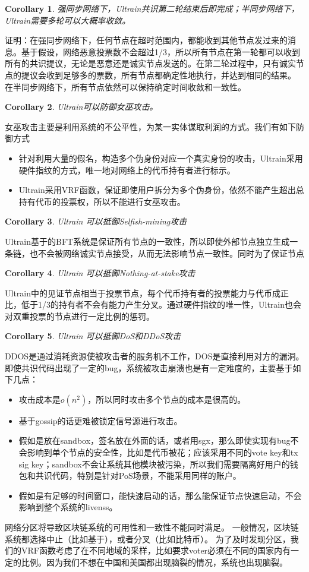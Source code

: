 \documentclass[12pt, UTF8]{article}
\newtheorem{corollary}{Corollary}[theorem]
\begin{document}
\begin{corollary}
强同步网络下，Ultrain共识第二轮结束后即完成；半同步网络下，Ultrain需要多轮可以大概率收敛。
\end{corollary}
证明：在强同步网络下，任何节点在超时范围内，都能收到其他节点发过来的消息。基于假设，网络恶意投票数不会超过1/3，所以所有节点在第一轮都可以收到所有的共识提议，无论是恶意还是诚实节点发送的。在第二轮过程中，只有诚实节点的提议会收到足够多的票数，所有节点都确定性地执行，并达到相同的结果。
在半同步网络下，所有节点依然可以保持确定时间收敛和一致性。

\begin{corollary}
Ultrain可以防御女巫攻击。
\end{corollary}
女巫攻击主要是利用系统的不公平性，为某一实体谋取利润的方式。我们有如下防御方式
\begin{itemize}
\item 针对利用大量的假名，构造多个伪身份对应一个真实身份的攻击，Ultrain采用硬件指纹的方式，唯一地对网络上的代币持有者进行标示。
\item Ultrain采用VRF函数，保证即使用户拆分为多个伪身份，依然不能产生超出总持有代币的投票权，所以不能进行女巫攻击。
\end{itemize}

\begin{corollary}
Ultrain 可以抵御Selfish-mining攻击
\end{corollary}
Ultrain基于的BFT系统是保证所有节点的一致性，所以即使外部节点独立生成一条链，也不会被网络诚实节点接受，从而无法影响节点一致性。同时为了保证节点

\begin{corollary}
Ultrain 可以抵御Nothing-at-stake攻击
\end{corollary}
Ultrain中的见证节点相当于投票节点，每个代币持有者的投票能力与代币成正比，低于1/3的持有者不会有能力产生分叉。通过硬件指纹的唯一性，Ultrain也会对双重投票的节点进行一定比例的惩罚。

\begin{corollary}
Ultrain 可以抵御DoS和DDoS攻击
\end{corollary}
DDOS是通过消耗资源使被攻击者的服务机不工作，DOS是直接利用对方的漏洞。
即使共识代码出现了一定的bug，系统被攻击崩溃也是有一定难度的，主要基于如下几点：
\begin{itemize}
\item 攻击成本是$o(n^2)$，所以同时攻击多个节点的成本是很高的。
\item 基于gossip的话更难被锁定信号源进行攻击。
\item 假如是放在sandbox，签名放在外面的话，或者用sgx，那么即使实现有bug不会影响到单个节点的安全性，比如是代币被花；应该采用不同的vote key和tx sig key；sandbox不会让系统其他模块被污染，所以我们需要隔离好用户的钱包和共识代码，特别是针对PoS场景，不能采用同样的账户。
\item 假如是有足够的时间窗口，能快速启动的话，那么能保证节点快速启动，不会影响到整个系统的livenss。
\end{itemize}

网络分区将导致区块链系统的可用性和一致性不能同时满足。
一般情况，区块链系统都选择中止（比如基于），或者分叉（比如比特币）。
为了及时发现分区，我们的VRF函数考虑了在不同地域的采样，比如要求voter必须在不同的国家内有一定的比例。因为我们不想在中国和美国都出现脑裂的情况，系统也出现脑裂。

\medskip


\end{document}
